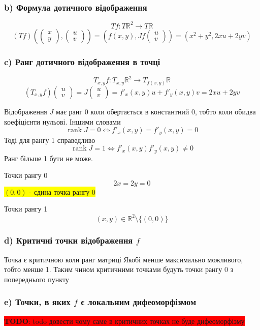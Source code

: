 \documentclass[10pt, a4paper]{article} %
\newcommand{\R}{\mathbb{R}}
\newcommand{\J}{J}
\DeclareMathOperator{\rank}{rank}
\newcommand{\todo}[1]{\colorbox{red}{\textbf{TODO}: #1}}
\begin{document}
\subsubsection*{b) Формула дотичного відображення}
\[Tf : T\R^2 \to T\R\]
\[(Tf)\left(\begin{pmatrix} x \\ y \end{pmatrix}, \begin{pmatrix} u \\ v \end{pmatrix}\right) 
= \left(f(x,y),\J f \begin{pmatrix} u \\ v \end{pmatrix}\right) 
= \left(x^2+y^2, 2xu+2yv\right)\]

\subsubsection*{c) Ранг дотичного відображення в точці}
\[T_{x,y} f : T_{x,y}\R^2 \to T_{f(x,y)}\R\]
\[(T_{x,y} f) \begin{pmatrix} u \\ v \end{pmatrix}
= J\begin{pmatrix} u \\ v \end{pmatrix} = f'_x(x,y) u + f'_y(x,y) v = 2xu+2yv\]

Відображення $J$ має ранг 0 коли обертається в константний 0, тобто коли обидва коефіцієнти нульові.
Іншими словами
\[\rank J = 0 \iff f'_x(x,y)=f'_y(x,y)=0\]
Тоді для рангу 1 справедливо
\[\rank J = 1 \iff f'_x(x,y)f'_y(x,y) \ne 0\]
Ранг більше 1 бути не може.

Точки рангу 0
\[2x=2y=0\]
\colorbox{yellow}{$(0,0)$ - єдина точка рангу 0}

Точки рангу 1
\[(x,y) \in \R^2 \setminus \{(0,0)\}\]

\subsubsection*{d) Критичні точки відображення $f$}

Точка є критичною коли ранг матриці Якобі менше максимально можливого, тобто менше 1. 
Таким чином критичними точками будуть точки рангу 0 з попереднього пункту

\subsubsection*{e) Точки, в яких $f$ є локальним дифеоморфізмом}
\todo{todo довести чому саме в критичних точках не буде дифеоморфізму}
\end{document}
